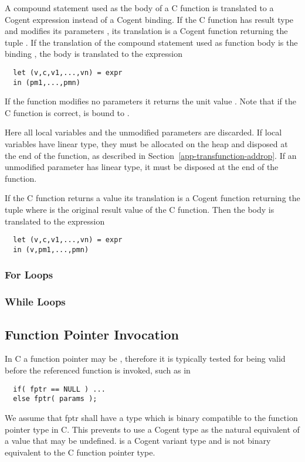 A compound statement used as the body of a C function is translated to a Cogent expression instead of a Cogent binding.
If the C function has result type  and modifies its parameters , its translation is 
a Cogent function returning the tuple . If the translation of the compound statement 
used as function body is the binding , the body is translated to the expression
\begin{verbatim}
  let (v,c,v1,...,vn) = expr
  in (pm1,...,pmn)
\end{verbatim}
If the function modifies no parameters
it returns the unit value \code{()}. Note that if the C function is correct,  is bound to \code{()}.

Here all local variables and the unmodified parameters are discarded. If local variables have linear type, they must
be allocated on the heap and disposed at the end of the function, as described in Section~\ref{app-transfunction-addrop}.
If an unmodified parameter has linear type, it must be disposed at the end of the function.

If the C function returns a value its translation is a Cogent function returning the tuple 
where  is the original result value of the C function. Then the body is translated to the expression
\begin{verbatim}
  let (v,c,v1,...,vn) = expr
  in (v,pm1,...,pmn)
\end{verbatim}

\subsubsection{For Loops}

\subsubsection{While Loops}


\subsection{Function Pointer Invocation}
\label{app-transfunction-pointer}

In C a function pointer may be , therefore it is typically tested for being valid before the
referenced function is invoked, such as in 
\begin{verbatim}
  if( fptr == NULL ) ...
  else fptr( params );
\end{verbatim}
We assume that fptr shall have a type which is binary compatible to the function pointer type in C.
This prevents to use a Cogent type  as the natural equivalent of a value that may be undefined.
 is a Cogent variant type and is not binary equivalent to the C function pointer type.

